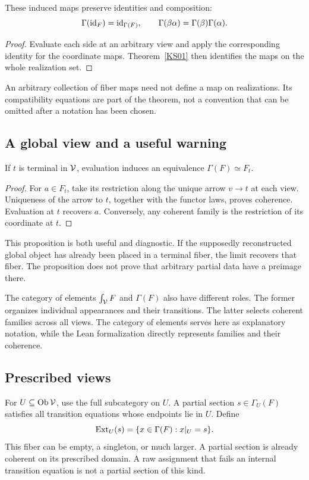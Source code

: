 \begin{proposition}\label{KS02}
These induced maps preserve identities and composition:
\[
 \Gamma(\operatorname{id}_F)=\operatorname{id}_{\Gamma(F)},\qquad
 \Gamma(\beta\alpha)=\Gamma(\beta)\Gamma(\alpha).
\]
\end{proposition}
\begin{proof}
Evaluate each side at an arbitrary view and apply the corresponding identity for the coordinate maps. Theorem~\ref{KS01} then identifies the maps on the whole realization set.
\end{proof}
An arbitrary collection of fiber maps need not define a map on realizations. Its compatibility equations are part of the theorem, not a convention that can be omitted after a notation has been chosen.

\subsection{A global view and a useful warning}
\begin{proposition}\label{KS03}
If \(t\) is terminal in \(\mathcal V\), evaluation induces an equivalence \(\Gamma(F)\simeq F_t\).
\end{proposition}
\begin{proof}
For \(a\in F_t\), take its restriction along the unique arrow \(v\to t\) at each view. Uniqueness of the arrow to \(t\), together with the functor laws, proves coherence. Evaluation at \(t\) recovers \(a\). Conversely, any coherent family is the restriction of its coordinate at \(t\).
\end{proof}
This proposition is both useful and diagnostic. If the supposedly reconstructed global object has already been placed in a terminal fiber, the limit recovers that fiber. The proposition does not prove that arbitrary partial data have a preimage there.

The category of elements \(\int_\mathcal V F\) and \(\Gamma(F)\) also have different roles. The former organizes individual appearances and their transitions. The latter selects coherent families across all views. The category of elements serves here as explanatory notation, while the Lean formalization directly represents families and their coherence.

\label{sec:glue}
\subsection{Prescribed views}
For \(U\subseteq\operatorname{Ob}\mathcal V\), use the full subcategory on \(U\). A partial section \(s\in\Gamma_U(F)\) satisfies all transition equations whose endpoints lie in \(U\). Define
\begin{equation}\label{eq:extension}
 \operatorname{Ext}_U(s)=\{x\in\Gamma(F):x|_U=s\}.
\end{equation}
This fiber can be empty, a singleton, or much larger. A partial section is already coherent on its prescribed domain. A raw assignment that fails an internal transition equation is not a partial section of this kind.

